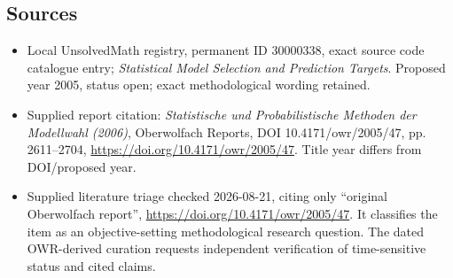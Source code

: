 \documentclass[11pt]{article}
\begin{document}
\subsection{Sources}
\begin{itemize}
\item Local UnsolvedMath registry, permanent ID 30000338, exact source code catalogue entry; \emph{Statistical Model Selection and Prediction Targets}. Proposed year 2005, status open; exact methodological wording retained.
\item Supplied report citation: \emph{Statistische und Probabilistische Methoden der Modellwahl (2006)}, Oberwolfach Reports, DOI 10.4171/owr/2005/47, pp. 2611--2704, \url{https://doi.org/10.4171/owr/2005/47}. Title year differs from DOI/proposed year.
\item Supplied literature triage checked 2026-08-21, citing only ``original Oberwolfach report'', \url{https://doi.org/10.4171/owr/2005/47}. It classifies the item as an objective-setting methodological research question. The dated OWR-derived curation requests independent verification of time-sensitive status and cited claims.
\end{itemize}
\end{document}
